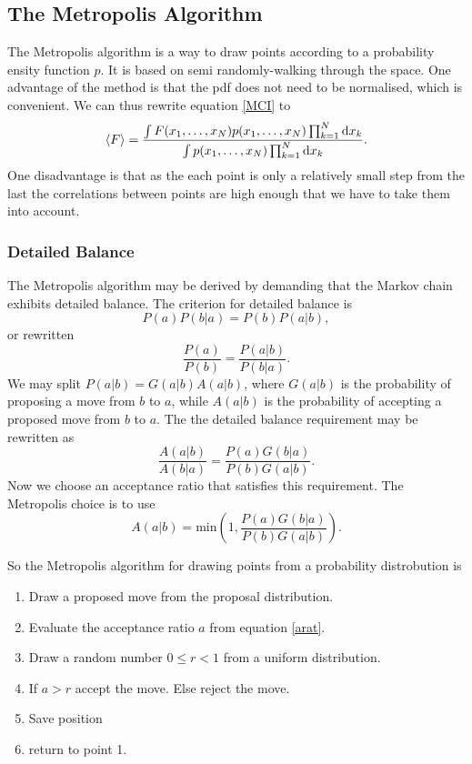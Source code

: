 \documentclass[a4paper,English,10pt]{article}
\newcommand{\dd}{\mathrm{d}}
\newcommand{\be}{\begin{equation}}
\newcommand{\ee}{\end{equation}}
\newcommand{\f}{\frac}
\renewcommand{\braket}{\Braket}
\begin{document}
\subsection{The Metropolis Algorithm}

The Metropolis algorithm is a way to draw points according to a probability ensity function $p$. It is based on semi randomly-walking through
the space. One advantage of the method is that the pdf does not need to be normalised, which is convenient.
We can thus rewrite equation \ref{MCI} to
\be
\braket{F} = \f{\int F(x_1,\ldots,x_N)p(x_1,\ldots,x_N)\prod_{k=1}^N\dd x_k}{\int p(x_1,\ldots,x_N)\prod_{k=1}^N\dd x_k}. \label{exp}
\ee
One disadvantage is that
as the each point is only a relatively small step from the last the correlations between points are high enough that we have to take them into account.


\subsubsection{Detailed Balance}
The Metropolis algorithm may be derived by demanding that the Markov chain exhibits detailed balance.
The criterion for detailed balance is
\be
P(a)P(b|a) = P(b)P(a|b),
\ee
or rewritten
\be
\f{P(a)}{P(b)} = \f{P(a|b)}{P(b|a)}.
\ee
We may split \(P(a|b) = G(a|b)A(a|b)\), where \(G(a|b)\) is the probability of proposing a move from $b$ to $a$, while
$A(a|b)$ is the probability of accepting a proposed move from $b$ to $a$. The the detailed balance requirement may be rewritten as
\be
\f{A(a|b)}{A(b|a)} = \f{P(a)G(b|a)}{P(b)G(a|b)}.
\ee
Now we choose an acceptance ratio that satisfies this requirement. The Metropolis choice is to use
\be
A(a|b) = \mathrm{min}\left(1,\f{P(a)G(b|a)}{P(b)G(a|b)}\right).\label{arat}
\ee

So the Metropolis algorithm for drawing points from a probability distrobution is
\begin{enumerate}
\item
  Draw a proposed move from the proposal distribution.
\item
  Evaluate the acceptance ratio $a$ from equation \ref{arat}.
\item
  Draw a random number $0 \leq r < 1$ from a uniform distribution.
\item
  If $a>r$ accept the move. Else reject the move.
\item
  Save position
\item
  return to point 1.
\end{enumerate}
  
\end{document}
